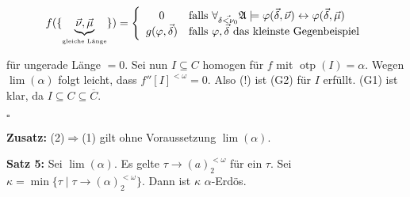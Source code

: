\documentclass[a4paper,fontsize=11pt]{scrartcl}
\newcommand{\otp}{\operatorname{otp}}
\begin{document}
\begin{itemize}
    $$f(\{\underbrace{\vec{\nu},\vec{\mu}}_{\mbox{\tiny gleiche
        Länge}}\}) = \left\{\begin{array}{cl} 0 & \mbox{falls
    }\forall_{\vec{\delta<\nu_0}} \mathfrak{A}\models
    \varphi(\vec{\delta},\vec{\nu}) \leftrightarrow
    \varphi(\vec{\delta}, \vec{\mu}) \\ g(\varphi, \vec{\delta}) &
    \mbox{falls } \varphi, \vec{\delta} \mbox{ das kleinste
      Gegenbeispiel} \end{array}\right. $$

    für ungerade Länge $= 0$. Sei nun $I\subseteq C$ homogen für $f$
    mit $\otp(I) = \alpha$. Wegen $\lim(\alpha)$ folgt leicht, dass
    $f''[I]^{<\omega} = 0$. Also (!) ist (G2) für $I$ erfüllt. (G1)
    ist klar, da $I \subseteq C \subseteq \overline{C}$.
\end{itemize}
\hfill $\square$

{\bf Zusatz:} (2)$\Rightarrow$(1) gilt ohne Voraussetzung $\lim(\alpha)$.

{\bf Satz 5:} Sei $\lim(\alpha)$. Es gelte $\tau \rightarrow
(a)^{<\omega}_2$ für ein $\tau$. Sei $\kappa = \min\{\tau \mid \tau
\rightarrow (\alpha)^{<\omega}_2\}$. Dann ist $\kappa$ $\alpha$-Erdös.
\end{document}
